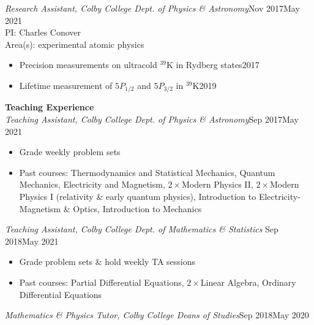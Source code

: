 \documentclass[10pt]{article}
\begin{document}
\noindent \textit{Research Assistant, Colby College Dept. of Physics \& Astronomy}\hfill Nov 2017\textendash May 2021 \\
PI: Charles Conover \\ %
Area(s): experimental atomic physics \vspace{-5pt}
\begin{itemize}
	\setlength\itemsep{-4pt}
	\item Precision measurements on ultracold $^{\text{39}}$K in Rydberg states\hfill 2017 
	\item Lifetime measurement of $5P_{1/2}$ and $5P_{3/2}$ in $^{\text{39}}$K\hfill 2019
\end{itemize}








\noindent \large{{\textbf{Teaching Experience}}} \normalsize \\ 
\noindent \textit{Teaching Assistant, Colby College Dept. of Physics \& Astronomy}\hfill Sep 2017\textendash May 2021 \vspace{-5pt}
\begin{itemize}
	\setlength\itemsep{-4pt}
	\item Grade weekly problem sets 
	\item Past courses:  Thermodynamics and Statistical Mechanics, Quantum Mechanics, Electricity and Magnetism, $2\times$Modern Physics II, $2\times$Modern Physics I (relativity \& early quantum physics), Introduction to Electricity-Magnetism \& Optics, Introduction to Mechanics 
\end{itemize}


\noindent \textit{Teaching Assistant, Colby College Dept. of Mathematics \& Statistics} \hfill Sep 2018\textendash May 2021 \vspace{-5pt}
\begin{itemize}
	\setlength\itemsep{-4pt}
	\item Grade problem sets \& hold weekly TA sessions
	\item Past courses: Partial Differential Equations, $2\times$Linear Algebra, Ordinary Differential Equations
\end{itemize}


\noindent \textit{Mathematics \& Physics Tutor, Colby College Deans of Studies}\hfill  Sep 2018\textendash May 2020\\
\end{document}
